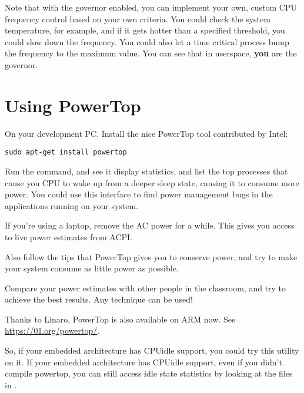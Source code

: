 Note that with the  governor enabled, you can implement
your own, custom CPU frequency control based on your own criteria. You
could check the system temperature, for example, and if it gets hotter
than a specified threshold, you could slow down the frequency. You
could also let a time critical process bump the frequency to the
maximum value. You can see that in userspace, {\bf you} are the
governor.

\section{Using PowerTop}

On your development PC. Install the nice PowerTop tool contributed by Intel:

\begin{verbatim}
sudo apt-get install powertop
\end{verbatim}

Run the  command, and see it display statistics, and
list the top processes that cause you CPU to wake up from a deeper
sleep state, causing it to consume more power. You could use this
interface to find power management bugs in the applications running on
your system.

If you're using a laptop, remove the AC power for a while. This gives
you access to live power estimates from ACPI.

Also follow the tips that PowerTop gives you to conserve power, and
try to make your system consume as little power as possible.

Compare your power estimates with other people in the classroom, and
try to achieve the best results. Any technique can be used!

Thanks to Linaro, PowerTop is also available on ARM now. See
\url{https://01.org/powertop/}.

So, if your embedded architecture has CPUidle support, you could try
this utility on it. If your embedded architecture has CPUidle support,
even if you didn't compile powertop, you can still access idle state
statistics by looking at the files
in .
